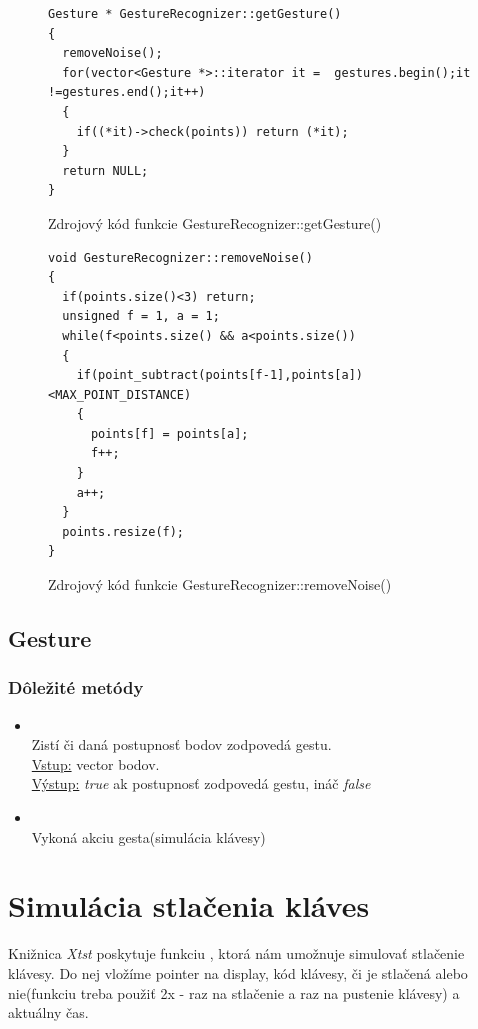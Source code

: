 \begin{figure}[htp]
\begin{lstlisting}
Gesture * GestureRecognizer::getGesture()
{
  removeNoise();
  for(vector<Gesture *>::iterator it =  gestures.begin();it !=gestures.end();it++)
  {
    if((*it)->check(points)) return (*it);
  }
  return NULL;
}
\end{lstlisting}
\caption{Zdrojový kód funkcie GestureRecognizer::getGesture()}
\label{fig:getGesture}
\end{figure}

\begin{figure}[htp]
\begin{lstlisting}
void GestureRecognizer::removeNoise()
{  
  if(points.size()<3) return;
  unsigned f = 1, a = 1;
  while(f<points.size() && a<points.size())
  {
    if(point_subtract(points[f-1],points[a])<MAX_POINT_DISTANCE)
    {
      points[f] = points[a];
      f++;
    }
    a++;
  }
  points.resize(f);
}
\end{lstlisting}
\caption{Zdrojový kód funkcie GestureRecognizer::removeNoise()}
\label{fig:removeNoise}
\end{figure}


\subsection{Gesture}

\subsubsection{Dôležité metódy}
\begin{itemize}
\item {}
\\Zistí či daná postupnosť bodov zodpovedá gestu.
\\ \underline{Vstup:} vector bodov.
\\ \underline{Výstup:} \textit{true} ak postupnosť zodpovedá gestu, ináč \textit{false}
\item {}
\\Vykoná akciu gesta(simulácia klávesy)
\end{itemize}


\section{Simulácia stlačenia kláves}
Knižnica \textit{Xtst} poskytuje funkciu , ktorá nám umožnuje simulovať stlačenie klávesy. Do nej vložíme pointer na display, kód klávesy, či je stlačená alebo nie(funkciu treba použiť 2x - raz na stlačenie a raz na pustenie klávesy) a aktuálny čas.

